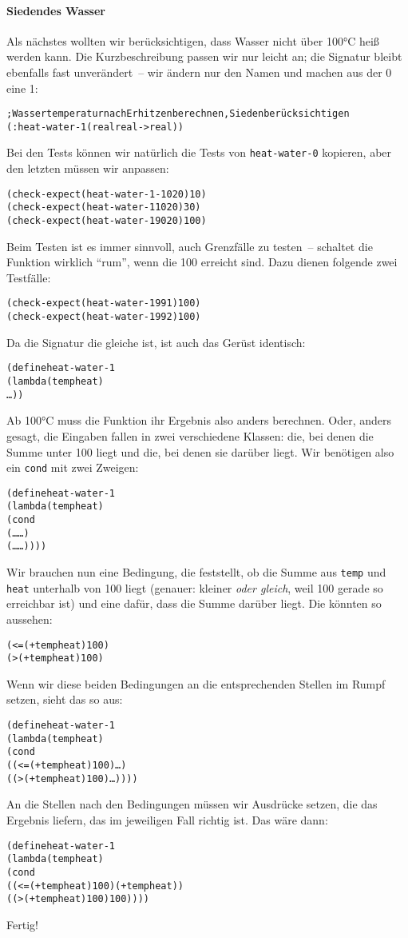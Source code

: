 \paragraph{Siedendes Wasser} Als nächstes wollten wir berücksichtigen,
dass Wasser nicht über 100°C heiß werden kann.  Die Kurzbeschreibung
passen wir nur leicht an; die Signatur bleibt ebenfalls fast
unverändert~-- wir ändern nur den Namen und machen aus der 0 eine 1:
%
\begin{alltt}
; Wassertemperatur nach Erhitzen berechnen, Sieden berücksichtigen
(: heat-water-1 (real real -> real))
\end{alltt}
%
Bei den Tests können wir natürlich die Tests von \texttt{heat-water-0}
kopieren, aber den letzten müssen wir anpassen:
%
\begin{alltt}
(check-expect (heat-water-1 -10 20) 10)
(check-expect (heat-water-1 10 20) 30)
(check-expect (heat-water-1 90 20) 100)
\end{alltt}
%
Beim Testen ist es immer sinnvoll, auch Grenzfälle zu testen~--
schaltet die Funktion wirklich "`rum"', wenn die 100 erreicht sind.
Dazu dienen folgende zwei Testfälle:
%
\begin{alltt}
(check-expect (heat-water-1 99 1) 100)
(check-expect (heat-water-1 99 2) 100)
\end{alltt}
%
Da die Signatur die gleiche ist, ist auch das Gerüst identisch:
%
\begin{alltt}
(define heat-water-1
  (lambda (temp heat)
    \ldots))
\end{alltt}
%
Ab 100°C muss die Funktion ihr Ergebnis also anders berechnen.  Oder,
anders gesagt, die Eingaben fallen in zwei verschiedene Klassen: die,
bei denen die Summe unter 100 liegt und die, bei denen sie darüber
liegt.
Wir benötigen also ein \texttt{cond} mit zwei
Zweigen:
%
\begin{alltt}
(define heat-water-1
  (lambda (temp heat)
    (cond
      (\ldots \ldots)
      (\ldots \ldots))))
\end{alltt}
%
Wir brauchen nun eine Bedingung, die feststellt, ob die Summe aus
\texttt{temp} und \texttt{heat} unterhalb von 100 liegt (genauer:
kleiner \emph{oder gleich}, weil 100 gerade so erreichbar ist) und
eine dafür, dass die Summe darüber liegt.  Die könnten so aussehen:
%
\begin{alltt}
(<= (+ temp heat) 100)
(> (+ temp heat) 100)
\end{alltt}
%
Wenn wir diese beiden Bedingungen an die entsprechenden Stellen im
Rumpf setzen, sieht das so aus:
%
\begin{alltt}
(define heat-water-1
  (lambda (temp heat)
    (cond
      ((<= (+ temp heat) 100) \ldots)
      ((> (+ temp heat) 100) \ldots))))
\end{alltt}
%
An die Stellen nach den Bedingungen müssen wir Ausdrücke setzen, die
das Ergebnis liefern, das im jeweiligen Fall richtig ist.  Das wäre dann:
%
\begin{alltt}
(define heat-water-1
  (lambda (temp heat)
    (cond
      ((<= (+ temp heat) 100) (+ temp heat))
      ((> (+ temp heat) 100) 100))))
\end{alltt}
%
Fertig!
%
%

